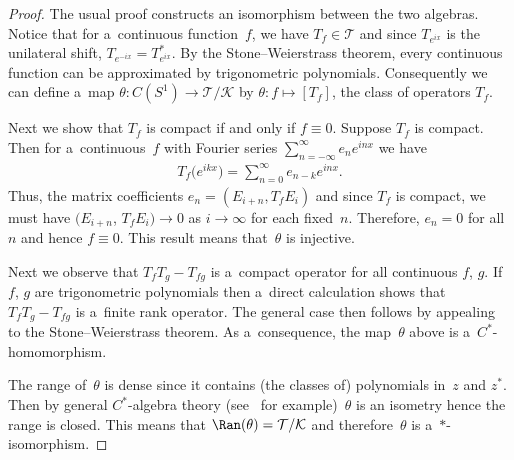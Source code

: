 \begin{proof}
The usual proof constructs an isomorphism between the two algebras.
Notice that for a~continuous function~$f$, we have $T_f\in\mathcal{T}$ and since $T_{e^{ix}}$ is the unilateral shift,
$T_{e^{-ix}}=T_{e^{ix}}^*$.
By the Stone--Weierstrass theorem, every continuous function can be approximated by trigonometric polynomials.
Consequently we can def\/ine a~map $\theta: C(S^1) \to \mathcal{T}/\mathcal{K}$ by $\theta: f \mapsto [T_f]$, the class of
operators $T_f$.

Next we show that $T_f$ is compact if and only if $f\equiv 0$.
Suppose $T_f$ is compact.
Then for a~continuous~$f$ with Fourier series $ \sum\limits_{n=-\infty}^\infty e_n e^{inx}$ we have
\begin{gather*}
T_f\big(e^{ikx}\big)=\sum\limits_{n=0}^\infty e_{n-k}e^{inx}.
\end{gather*}
Thus, the matrix coef\/f\/icients $e_n=(E_{i+n},T_f E_i)$ and since $T_f$ is compact, we must have $(E_{i+n}$,
$T_f E_i)\to0$
as $i\to\infty$ for each f\/ixed~$n$.
Therefore, $e_n=0$ for all~$n$ and hence $f\equiv 0$.
This result means that~$\theta$ is injective.

Next we observe that $T_fT_g-T_{fg}$ is a~compact operator for all continuous $f$, $g$.
If $f$, $g$ are trigonometric polynomials then a~direct calculation shows that $T_fT_g-T_{fg}$ is a~f\/inite rank operator.
The general case then follows by appealing to the Stone--Weierstrass theorem.
As a~consequence, the map~$\theta$ above is a~$C^*$-homomorphism.

The range of~$\theta$ is dense since it contains (the classes of) polynomials in~$z$ and $z^*$.
Then by general $C^*$-algebra theory (see~\cite{Conway} for example)~$\theta$ is an isometry hence the range is closed.
This means that $\Ran(\theta)=\mathcal{T}/\mathcal{K}$ and therefore~$\theta$ is a~$*$-isomorphism.
\end{proof}
